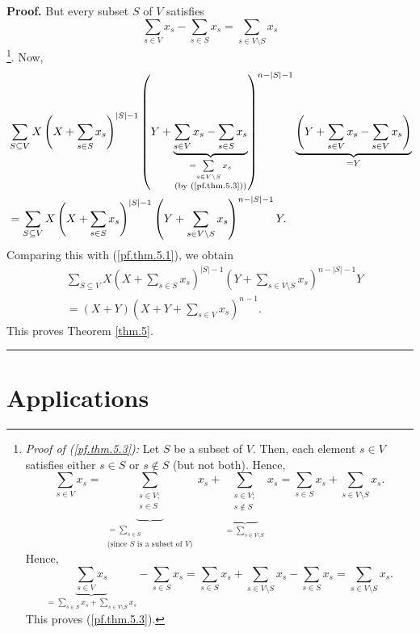 \documentclass[numbers=enddot,12pt,final,onecolumn,notitlepage]{scrartcl}%
\theoremstyle{definition}
\newenvironment{proof}[1][Proof]{\noindent\textbf{#1.} }{\ \rule{0.5em}{0.5em}}
\let\sumnonlimits\sum
\renewcommand{\sum}{\sumnonlimits\limits}
\newenvironment{verlong}{}{}
\begin{document}
\begin{verlong}
\begin{proof}
But every subset $S$ of $V$ satisfies%
\begin{equation}
\sum_{s\in V}x_{s}-\sum_{s\in S}x_{s}=\sum_{s\in V\setminus S}x_{s}
\label{pf.thm.5.3}%
\end{equation}
\footnote{\textit{Proof of (\ref{pf.thm.5.3}):} Let $S$ be a subset of $V$.
Then, each element $s\in V$ satisfies either $s\in S$ or $s\notin S$ (but not
both). Hence,%
\[
\sum_{s\in V}x_{s}=\underbrace{\sum_{\substack{s\in V;\\s\in S}}}%
_{\substack{=\sum_{s\in S}\\\text{(since }S\text{ is a subset of }V\text{)}%
}}x_{s}+\underbrace{\sum_{\substack{s\in V;\\s\notin S}}}_{=\sum_{s\in
V\setminus S}}x_{s}=\sum_{s\in S}x_{s}+\sum_{s\in V\setminus S}x_{s}.
\]
Hence,%
\[
\underbrace{\sum_{s\in V}x_{s}}_{=\sum_{s\in S}x_{s}+\sum_{s\in V\setminus
S}x_{s}}-\sum_{s\in S}x_{s}=\sum_{s\in S}x_{s}+\sum_{s\in V\setminus S}%
x_{s}-\sum_{s\in S}x_{s}=\sum_{s\in V\setminus S}x_{s}.
\]
This proves (\ref{pf.thm.5.3}).}. Now,%
\begin{align*}
&  \sum_{S\subseteq V}X\left(  X+\sum_{s\in S}x_{s}\right)  ^{\left\vert
S\right\vert -1}\left(  Y+\underbrace{\sum_{s\in V}x_{s}-\sum_{s\in S}x_{s}%
}_{\substack{=\sum_{s\in V\setminus S}x_{s}\\\text{(by (\ref{pf.thm.5.3}))}%
}}\right)  ^{n-\left\vert S\right\vert -1}\underbrace{\left(  Y+\sum_{s\in
V}x_{s}-\sum_{s\in V}x_{s}\right)  }_{=Y}\\
&  =\sum_{S\subseteq V}X\left(  X+\sum_{s\in S}x_{s}\right)  ^{\left\vert
S\right\vert -1}\left(  Y+\sum_{s\in V\setminus S}x_{s}\right)  ^{n-\left\vert
S\right\vert -1}Y.
\end{align*}
Comparing this with (\ref{pf.thm.5.1}), we obtain%
\begin{align*}
&  \sum_{S\subseteq V}X\left(  X+\sum_{s\in S}x_{s}\right)  ^{\left\vert
S\right\vert -1}\left(  Y+\sum_{s\in V\setminus S}x_{s}\right)  ^{n-\left\vert
S\right\vert -1}Y\\
&  =\left(  X+Y\right)  \left(  X+Y+\sum_{s\in V}x_{s}\right)  ^{n-1}.
\end{align*}
This proves Theorem \ref{thm.5}.
\end{proof}
\end{verlong}


\section{Applications}
\end{document}
